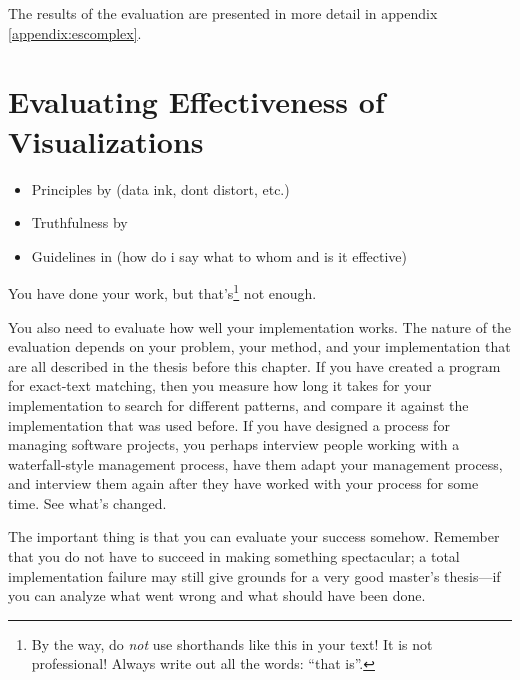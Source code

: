 
The results of the evaluation are presented in more detail in appendix \ref{appendix:escomplex}.

\section{Evaluating Effectiveness of Visualizations}

\begin{itemize}
	\item Principles by \citet{tufte_visual_1986} (data ink, dont distort, etc.)
	\item Truthfulness by \citet{azzam_j-b_2013}
	\item Guidelines in \citet{kraak_cartographic_1998} (how do i say what to whom and is it effective)
\end{itemize}

You have done your work, but that's\footnote{By the way, do \emph{not} use
shorthands like this in your text! It is not professional! Always write out all
the words: ``that is''.} not enough. 

You also need to evaluate how well your implementation works.  The
nature of the evaluation depends on your problem, your method, and
your implementation that are all described in the thesis before this
chapter.  If you have created a program for exact-text matching, then
you measure how long it takes for your implementation to search for
different patterns, and compare it against the implementation that was
used before.  If you have designed a process for managing software
projects, you perhaps interview people working with a waterfall-style
management process, have them adapt your management process, and
interview them again after they have worked with your process for some
time. See what's changed.

The important thing is that you can evaluate your success somehow.
Remember that you do not have to succeed in making something spectacular; a
total implementation failure may still give grounds for a very good master's
thesis---if you can analyze what went wrong and what should have been done.

 
